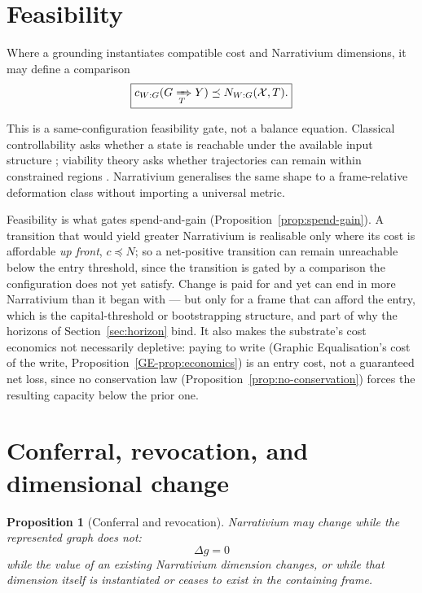 \documentclass[11pt,a4paper]{article}
\newtheorem{proposition}[definition]{Proposition}
\theoremstyle{remark}
\begin{document}
\section{Feasibility}\label{sec:feasibility}

Where a grounding instantiates compatible cost and Narrativium dimensions, it may define a comparison
\[
\boxed{
c_{W:G}(G\xRightarrow[T]{}Y)
\preceq
N_{W:G}(\mathcal X,T).
}
\]

This is a same-configuration feasibility gate, not a balance equation. Classical controllability asks whether a state is reachable under the available input structure \citep{kalman1960control}; viability theory asks whether trajectories can remain within constrained regions \citep{aubin1991viability}. Narrativium generalises the same shape to a frame-relative deformation class without importing a universal metric.

Feasibility is what gates spend-and-gain (Proposition~\ref{prop:spend-gain}). A transition that would yield greater Narrativium is realisable only where its cost is affordable \emph{up front}, $c\preceq N$; so a net-positive transition can remain unreachable below the entry threshold, since the transition is gated by a comparison the configuration does not yet satisfy. Change is paid for and yet can end in more Narrativium than it began with --- but only for a frame that can afford the entry, which is the capital-threshold or bootstrapping structure, and part of why the horizons of Section~\ref{sec:horizon} bind. It also makes the substrate's cost economics not necessarily depletive: paying to write (Graphic Equalisation's cost of the write, Proposition~\ref{GE-prop:economics}) is an entry cost, not a guaranteed net loss, since no conservation law (Proposition~\ref{prop:no-conservation}) forces the resulting capacity below the prior one.

\section{Conferral, revocation, and dimensional change}\label{sec:conferral}

\begin{proposition}[Conferral and revocation]\label{prop:conferral}
Narrativium may change while the represented graph does not:
\[
\Delta g=0
\]
while the value of an existing Narrativium dimension changes, or while that dimension itself is instantiated or ceases to exist in the containing frame.
\end{proposition}
\end{document}

